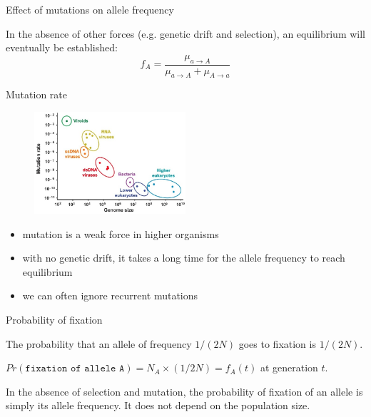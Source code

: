 \begin{frame}{Effect of mutations on allele frequency}

	In the absence of other forces (e.g. genetic drift and selection), an equilibrium will
	eventually be established:
	\begin{equation}
		f_A = \frac{\mu_{a \rightarrow A}}{\mu_{a \rightarrow A}+\mu_{A \rightarrow a}}
	\end{equation}

\end{frame}


\begin{frame}{Mutation rate}

	\begin{figure}
                \includegraphics[width=0.5\textwidth]{Pics/mutrate}
        \end{figure}

	\small
	\begin{itemize}
		\item mutation is a weak force in higher organisms
		\item with no genetic drift, it takes a long time for the allele frequency to reach equilibrium
		\item we can often ignore recurrent mutations
	\end{itemize}

\end{frame}


\begin{frame}{Probability of fixation}

	The probability that an allele of frequency $1/(2N)$ goes to fixation is $1/(2N)$.

	\bigskip

	\pause
	$Pr(\texttt{fixation of allele A}) = N_A \times (1/2N) = f_A(t) $ at generation $t$.

	\begin{block}{}
	In the absence of selection and mutation, the probability of fixation of an allele is simply its allele frequency.
	It does not depend on the population size.
	\end{block}

\end{frame}


